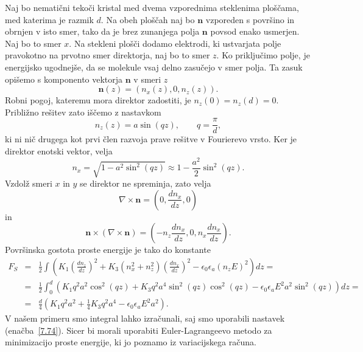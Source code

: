 Naj bo nematični tekoči kristal med dvema vzporednima
steklenima ploščama, med katerima je razmik $d$. Na obeh ploščah naj bo $\mathbf{n}$ vzporeden
s površino in obrnjen v isto smer, tako da je brez zunanjega 
polja $\mathbf{n}$ povsod enako usmerjen. Naj bo to smer $x$.
Na stekleni plošči dodamo elektrodi, ki ustvarjata polje pravokotno na 
prvotno smer direktorja, naj bo to smer $z$.
Ko priključimo polje, je energijsko ugodnejše, da
se molekule vsaj delno zasučejo v smer polja. Ta zasuk opišemo s
komponento vektorja $\mathbf{n}$ v smeri $z$
\begin{equation}
\mathbf{n}(z)=(n_{x}(z),0,n_{z}(z)).
\label{7.73}
\end{equation}
Robni pogoj, kateremu mora direktor zadostiti,
je $n_{z}(0)=n_{z}(d)=0$. Približno rešitev zato iščemo z nastavkom 
\begin{equation}
n_{z}(z)=a\sin (qz), \qquad q=\frac{\pi}{d},
\label{7.74}
\end{equation}
ki ni nič drugega kot prvi člen razvoja prave rešitve v Fourierevo vrsto.
Ker je direktor enotski vektor, velja
\begin{equation}
n_x = \sqrt{1-a^2\sin^2(qz)} \approx 1 - \frac{a^2}{2}\sin^2(qz).
\end{equation}
Vzdolž smeri $x$ in $y$ se direktor ne spreminja, zato velja
\begin{equation}
\nabla\times\mathbf{n}=(0,\frac{dn_{x}}{dz},0)
\label{7.75}
\end{equation}
 in 
\begin{equation}
\mathbf{n}\times(\nabla\times\mathbf{n})=(-n_{z}\frac{dn_{x}}{dz},0,
n_{x}\frac{dn_{x}}{dz}).
\label{7.76}
\end{equation}
Površinska gostota proste energije je tako do konstante
\begin{eqnarray}
F_S & = & \frac{1}{2}\int\left(K_{1}\left(\frac{dn_{z}}{dz}\right)^{2}+K_{3}(n_x^2+n_{z}^{2})
\left(\frac{dn_{x}}{dz}\right)^{2}-
\epsilon_{0}\epsilon_{a}(n_{z}E)^{2}\right)dz=\nonumber \\
 & = & \frac{1}{2}\int_{0}^{d}
 \left(K_{1}q^{2}a^{2}\cos^{2}(qz)+K_{3}q^{2}a^{4}\sin^{2}(qz)\cos^2(qz)-
 \epsilon_{0}\epsilon_{a}E^2a^{2}\sin^{2}(qz)\right)dz=\nonumber \\
 & = & \frac{d}{4}\left( K_{1}q^{2}a^2+\frac{1}{4}K_{3}q^{2}a^4-\epsilon_{0}\epsilon_{a}E^2a^2\right).
\end{eqnarray}
V našem primeru smo integral lahko izračunali, saj smo uporabili nastavek (enačba~\ref{7.74}).
Sicer bi morali uporabiti Euler-Lagrangeevo metodo za minimizacijo proste energije, ki 
jo poznamo iz variacijskega računa.

